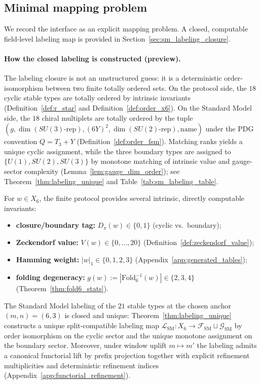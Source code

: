 \subsection{Minimal mapping problem}
\label{subsec:min_mapping_problem}

We record the interface as an explicit mapping problem.
A closed, computable field-level labeling map is provided in Section~\ref{sec:sm_labeling_closure}.
\paragraph{How the closed labeling is constructed (preview).}
The labeling closure is not an unstructured guess: it is a deterministic order-isomorphism between two finite totally ordered sets.
On the protocol side, the $18$ cyclic stable types are totally ordered by intrinsic invariants (Definition~\ref{def:r_star} and Definition~\ref{def:order_x6}).
On the Standard Model side, the $18$ chiral multiplets are totally ordered by the tuple $(g,\dim(SU(3)\text{-rep}),(6Y)^2,\dim(SU(2)\text{-rep}),\text{name})$ under the PDG convention $Q=T_3+Y$ (Definition~\ref{def:order_fsm}).
Matching ranks yields a unique cyclic assignment, while the three boundary types are assigned to $\{U(1),SU(2),SU(3)\}$ by monotone matching of intrinsic value and gauge-sector complexity (Lemma~\ref{lem:gauge_dim_order}); see Theorem~\ref{thm:labeling_unique} and Table~\ref{tab:sm_labeling_table}.

\begin{definition}\label{def:x6_invariants}
For $w\in X_6$, the finite protocol provides several intrinsic, directly computable invariants:
\begin{itemize}
\item \textbf{closure/boundary tag:} $D_\pi(w)\in\{0,1\}$ (cyclic vs.\ boundary);
\item \textbf{Zeckendorf value:} $V(w)\in\{0,\dots,20\}$ (Definition~\ref{def:zeckendorf_value});
\item \textbf{Hamming weight:} $|w|_1\in\{0,1,2,3\}$ (Appendix~\ref{app:generated_tables});
\item \textbf{folding degeneracy:} $g(w):=|\mathrm{Fold}_6^{-1}(w)|\in\{2,3,4\}$ (Theorem~\ref{thm:fold6_stats}).
\end{itemize}
\end{definition}

\begin{proposition}[Closed Standard Model labeling at $(m,n)=(6,3)$]\label{prop:sm_labeling_closed}
The Standard Model labeling of the $21$ stable types at the chosen anchor $(m,n)=(6,3)$ is closed and unique:
Theorem~\ref{thm:labeling_unique} constructs a unique split-compatible labeling map $\mathcal{L}_{\mathrm{SM}}:X_6\to \mathcal{F}_{\mathrm{SM}}\sqcup\mathcal{G}_{\mathrm{SM}}$ by order isomorphism on the cyclic sector and the unique monotone assignment on the boundary sector.
Moreover, under window uplift $m\mapsto m'$ the labeling admits a canonical functorial lift by prefix projection together with explicit refinement multiplicities and deterministic refinement indices (Appendix~\ref{app:functorial_refinement}).
\end{proposition}

